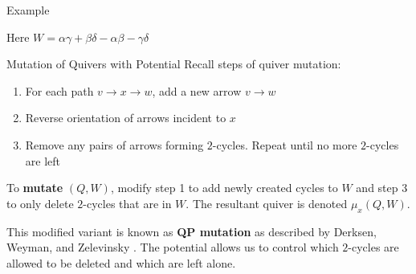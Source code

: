 \begin{frame}{Example}
\begin{center}
	\end{center}
	Here $W = \alpha\gamma + \beta\delta - \alpha\beta - \gamma\delta$
\end{frame}

\begin{frame}{Mutation of Quivers with Potential}
Recall steps of quiver mutation:
\begin{enumerate}
    \item For each path $v \to x \to w$, add a new arrow $v \to w$
    \item Reverse orientation of arrows incident to $x$
    \item Remove any pairs of arrows forming $2$-cycles. Repeat until no more $2$-cycles are left
\end{enumerate}
To \textbf{mutate} $(Q, W)$, modify step 1 to add newly created cycles to $W$ and step 3 to only delete $2$-cycles that are in $W$. The resultant quiver is denoted $\mu_x(Q, W)$.

\vspace{0.5cm}

This modified variant is known as \textbf{QP mutation} as described by Derksen, Weyman, and Zelevinsky \cite{derksenQuiversPotentialsTheir2007}. The potential allows us to control which $2$-cycles are allowed to be deleted and which are left alone.
\end{frame}

